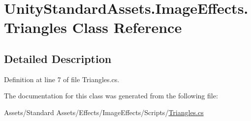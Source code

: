 \hypertarget{class_unity_standard_assets_1_1_image_effects_1_1_triangles}{}\section{Unity\+Standard\+Assets.\+Image\+Effects.\+Triangles Class Reference}
\label{class_unity_standard_assets_1_1_image_effects_1_1_triangles}


\subsection{Detailed Description}


Definition at line 7 of file Triangles.\+cs.



The documentation for this class was generated from the following file\+:\begin{DoxyCompactItemize}
\item 
Assets/\+Standard Assets/\+Effects/\+Image\+Effects/\+Scripts/\mbox{\hyperlink{_triangles_8cs}{Triangles.\+cs}}\end{DoxyCompactItemize}
